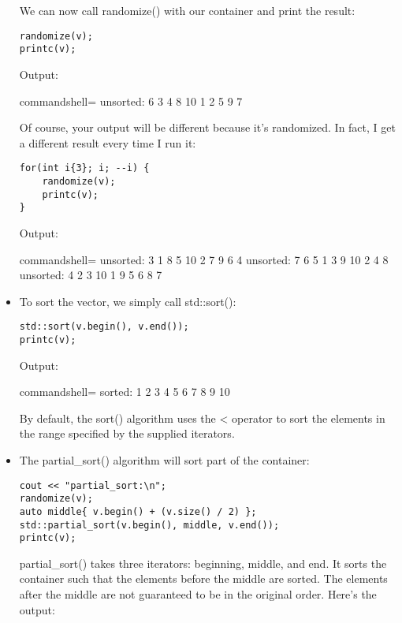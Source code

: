 \begin{itemize}
We can now call randomize() with our container and print the result:

\begin{lstlisting}[style=styleCXX]
randomize(v);
printc(v);
\end{lstlisting}

Output:

\begin{tcblisting}{commandshell={}}
unsorted: 6 3 4 8 10 1 2 5 9 7
\end{tcblisting}

Of course, your output will be different because it's randomized. In fact, I get a different result every time I run it:

\begin{lstlisting}[style=styleCXX]
for(int i{3}; i; --i) {
	randomize(v);
	printc(v);
}
\end{lstlisting}

Output:

\begin{tcblisting}{commandshell={}}
unsorted: 3 1 8 5 10 2 7 9 6 4
unsorted: 7 6 5 1 3 9 10 2 4 8
unsorted: 4 2 3 10 1 9 5 6 8 7
\end{tcblisting}

\item 
To sort the vector, we simply call std::sort():

\begin{lstlisting}[style=styleCXX]
std::sort(v.begin(), v.end());
printc(v);
\end{lstlisting}

Output:

\begin{tcblisting}{commandshell={}}
sorted: 1 2 3 4 5 6 7 8 9 10
\end{tcblisting}

By default, the sort() algorithm uses the < operator to sort the elements in the range specified by the supplied iterators.

\item 
The partial\_sort() algorithm will sort part of the container:

\begin{lstlisting}[style=styleCXX]
cout << "partial_sort:\n";
randomize(v);
auto middle{ v.begin() + (v.size() / 2) };
std::partial_sort(v.begin(), middle, v.end());
printc(v);
\end{lstlisting}

partial\_sort() takes three iterators: beginning, middle, and end. It sorts the container such that the elements before the middle are sorted. The elements after the middle are not guaranteed to be in the original order. Here's the output:


\end{itemize}
